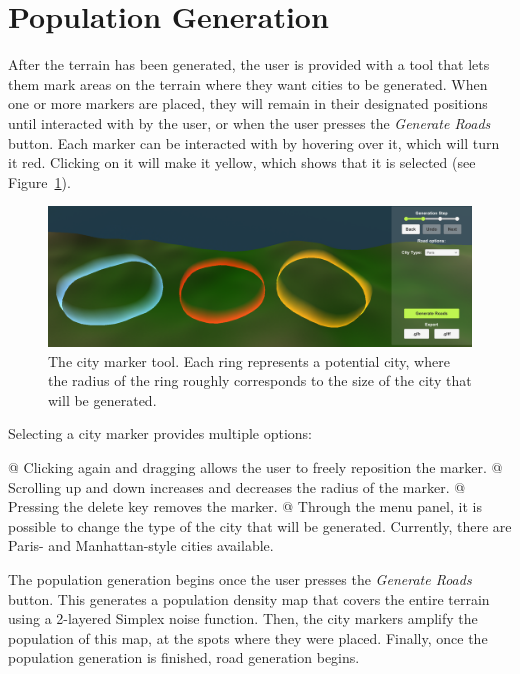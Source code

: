 \section{Population Generation}

After the terrain has been generated, the user is provided with a tool that lets them mark areas on the terrain where they want cities to be generated.
When one or more markers are placed, they will remain in their designated positions until interacted with by the user, or when the user presses the \textit{Generate Roads} button.
Each marker can be interacted with by hovering over it, which will turn it red.
Clicking on it will make it yellow, which shows that it is selected (see Figure~\ref{fig:citymarkers}). 

\begin{figure}[h!]
  \centering

  \includegraphics[width=\textwidth]{figure/citymarkers.png}
  \caption{The city marker tool. Each ring represents a potential city, where the radius of the ring roughly corresponds to the size of the city that will be generated.}

  \label{fig:citymarkers}
\end{figure}

\newpage 

Selecting a city marker provides multiple options:
\begin{easylist}
  @ Clicking again and dragging allows the user to freely reposition the marker.
  @ Scrolling up and down increases and decreases the radius of the marker.
  @ Pressing the delete key removes the marker.
  @ Through the menu panel, it is possible to change the type of the city that will be generated. Currently, there are Paris- and Manhattan-style cities available.
\end{easylist}

The population generation begins once the user presses the \textit{Generate Roads} button.
This generates a population density map that covers the entire terrain using a 2-layered Simplex noise function.
Then, the city markers amplify the population of this map, at the spots where they were placed.
Finally, once the population generation is finished, road generation begins.
